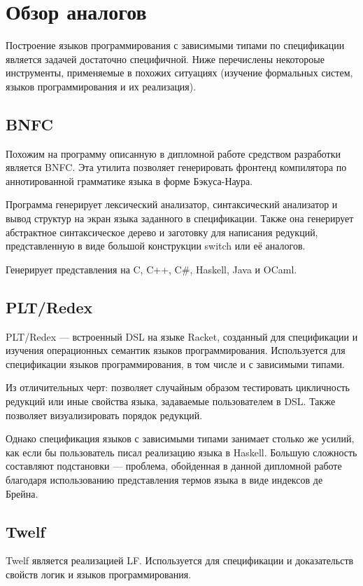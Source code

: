 \section{Обзор аналогов}
Построение языков программирования с зависимыми типами по спецификации является задачей достаточно специфичной. Ниже перечислены некотороые инструменты, применяемые в похожих ситуациях (изучение формальных систем, языков программирования и их реализация).

\subsection{BNFC}
Похожим на программу описанную в дипломной работе средством разработки является BNFC\cite{bnfc}. Эта утилита позволяет генерировать фронтенд компилятора по аннотированной грамматике языка в форме Бэкуса-Наура\cite{lbnf}.

Программа генерирует лексический анализатор, синтаксический анализатор и вывод структур на экран языка заданного в спецификации. Также она генерирует абстрактное синтаксическое дерево и заготовку для написания редукций, представленную в виде большой конструкции switch или её аналогов.

Генерирует представления на C, C++, C\#, Haskell, Java и OCaml.

\subsection{PLT/Redex}
PLT/Redex\cite{plt:redex} --- встроенный DSL на языке Racket, созданный для спецификации и изучения операционных семантик языков программирования. Используется для спецификации языков программирования, в том числе и с зависимыми типами.

Из отличительных черт: позволяет случайным образом тестировать цикличность редукций или иные свойства языка, задаваемые пользователем в DSL. Также позволяет визуализировать порядок редукций.

Однако спецификация языков с зависимыми типами занимает столько же усилий, как если бы пользователь писал реализацию языка в Haskell\cite{plt:ex}. Большую сложность составляют подстановки --- проблема, обойденная в данной дипломной работе благодаря использованию представления термов языка в виде индексов де Брейна.

\subsection{Twelf}
Twelf\cite{twelf} является реализацией LF\cite{Pfenning2002}. Используется для спецификации и доказательств свойств логик и языков программирования.

